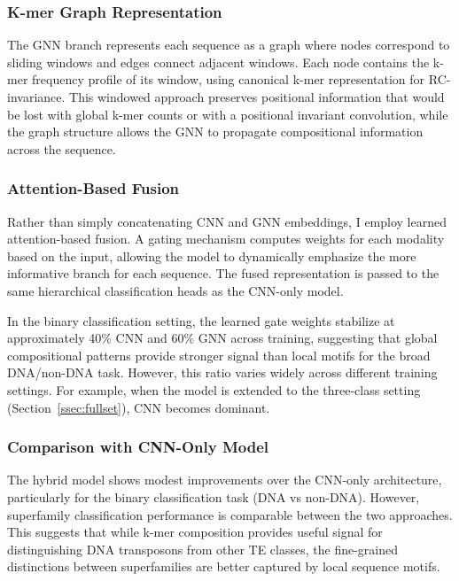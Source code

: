 \documentclass[12pt]{article}
\begin{document}
\subsubsection{K-mer Graph Representation}

The GNN branch represents each sequence as a graph where nodes correspond to sliding windows and edges connect adjacent windows. Each node contains the k-mer frequency profile of its window, using canonical k-mer representation for RC-invariance. This windowed approach preserves positional information that would be lost with global k-mer counts or with a positional invariant convolution, while the graph structure allows the GNN to propagate compositional information across the sequence. 

\subsubsection{Attention-Based Fusion}

Rather than simply concatenating CNN and GNN embeddings, I employ learned attention-based fusion. A gating mechanism computes weights for each modality based on the input, allowing the model to dynamically emphasize the more informative branch for each sequence. The fused representation is passed to the same hierarchical classification heads as the CNN-only model.

In the binary classification setting, the learned gate weights stabilize at approximately 40\% CNN and 60\% GNN across training, suggesting that global compositional patterns provide stronger signal than local motifs for the broad DNA/non-DNA task. However, this ratio varies widely across different training settings. For example, when the model is extended to the three-class setting (Section~\ref{ssec:fullset}), CNN becomes dominant.

\subsubsection{Comparison with CNN-Only Model}

The hybrid model shows modest improvements over the CNN-only architecture, particularly for the binary classification task (DNA vs non-DNA). However, superfamily classification performance is comparable between the two approaches. This suggests that while k-mer composition provides useful signal for distinguishing DNA transposons from other TE classes, the fine-grained distinctions between superfamilies are better captured by local sequence motifs.
\end{document}
